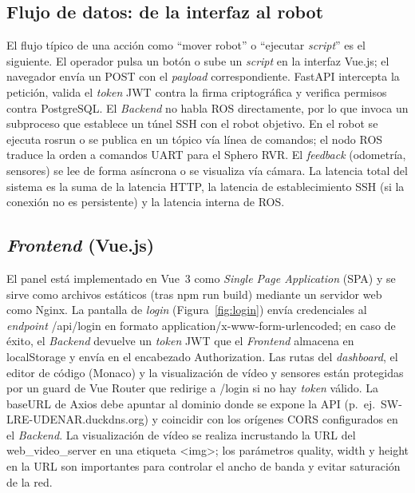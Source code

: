\documentclass[12pt]{article}
\numberwithin{figure}{section}
\numberwithin{table}{section}
\def\code#1{#1}%
\newcommand{\code}[1]{\textcolor{codeblue}{\url{#1}}}
\begin{document}
\subsection{Flujo de datos: de la interfaz al robot}

El flujo típico de una acción como ``mover robot'' o ``ejecutar \textit{script}'' es el siguiente. El operador pulsa un botón o sube un \textit{script} en la interfaz Vue.js; el navegador envía un \code{POST} con el \textit{payload} correspondiente. FastAPI intercepta la petición, valida el \textit{token} JWT contra la firma criptográfica y verifica permisos contra PostgreSQL. El \textit{Backend} no habla ROS directamente, por lo que invoca un subproceso que establece un túnel SSH con el robot objetivo. En el robot se ejecuta \code{rosrun} o se publica en un tópico vía línea de comandos; el nodo ROS traduce la orden a comandos UART para el Sphero RVR. El \emph{feedback} (odometría, sensores) se lee de forma asíncrona o se visualiza vía cámara. La latencia total del sistema es la suma de la latencia HTTP, la latencia de establecimiento SSH (si la conexión no es persistente) y la latencia interna de ROS.


\subsection{\textit{Frontend} (Vue.js)}

El panel está implementado en Vue~3 como \emph{Single Page Application} (SPA) y se sirve como archivos estáticos (tras \code{npm run build}) mediante un servidor web como Nginx. La pantalla de \textit{login} (Figura~\ref{fig:login}) envía credenciales al \emph{endpoint} \code{/api/login} en formato \code{application/x-www-form-urlencoded}; en caso de éxito, el \textit{Backend} devuelve un \textit{token} JWT que el \textit{Frontend} almacena en \code{localStorage} y envía en el encabezado \code{Authorization}. Las rutas del \textit{dashboard}, el editor de código (Monaco) y la visualización de vídeo y sensores están protegidas por un guard de Vue Router que redirige a \code{/login} si no hay \textit{token} válido. La \code{baseURL} de Axios debe apuntar al dominio donde se expone la API (p.\ ej.\ \code{SW-LRE-UDENAR.duckdns.org}) y coincidir con los orígenes CORS configurados en el \textit{Backend}. La visualización de vídeo se realiza incrustando la URL del \code{web\_video\_server} en una etiqueta \code{<img>}; los parámetros \code{quality}, \code{width} y \code{height} en la URL son importantes para controlar el ancho de banda y evitar saturación de la red.
\end{document}

